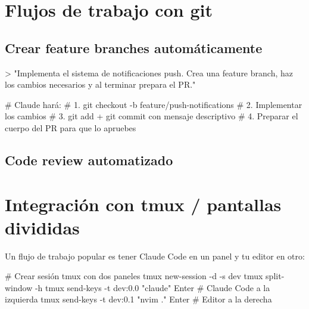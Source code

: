 \documentclass[11pt,a4paper]{book}
\begin{document}
\section{Flujos de trabajo con git}
\subsection{Crear feature branches automáticamente}
\begin{codebox}
> "Implementa el sistema de notificaciones push. Crea una feature branch,
   haz los cambios necesarios y al terminar prepara el PR."

# Claude hará:
# 1. git checkout -b feature/push-notifications
# 2. Implementar los cambios
# 3. git add + git commit con mensaje descriptivo
# 4. Preparar el cuerpo del PR para que lo apruebes
\end{codebox}
\subsection{Code review automatizado}
\section{Integración con tmux / pantallas divididas}
Un flujo de trabajo popular es tener Claude Code en un panel y tu editor en otro:

\begin{codebox}
# Crear sesión tmux con dos paneles
tmux new-session -d -s dev
tmux split-window -h
tmux send-keys -t dev:0.0 "claude" Enter  # Claude Code a la izquierda
tmux send-keys -t dev:0.1 "nvim ." Enter  # Editor a la derecha
\end{codebox}
\end{document}
